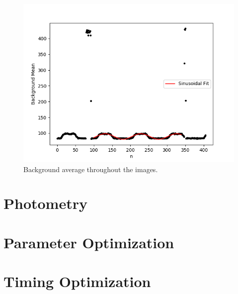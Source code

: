 \documentclass{aa}
\begin{document}
\begin{figure}
\centering

\includegraphics[width=.4\textwidth]{background_avg.png}

\caption{Background average throughout the images.}
\label{fig:mean}
\end{figure}

\section{Photometry}

\section{Parameter Optimization} \label{sec:param_opt}

\section{Timing Optimization}


%

%
%
\end{document}
